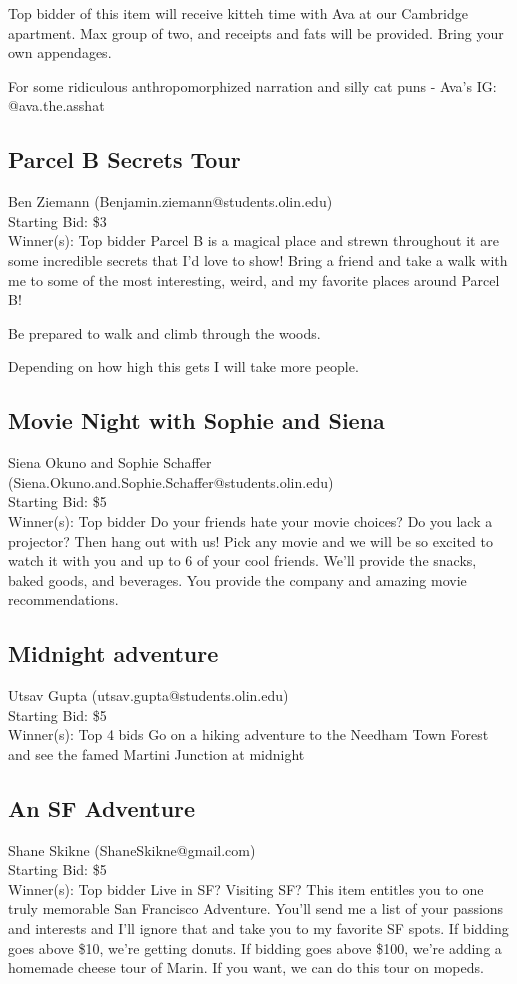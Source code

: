 \documentclass[11pt]{article}
\begin{document}
Top bidder of this item will receive kitteh time with Ava at our Cambridge apartment. Max group of two, and receipts and fats will be provided. Bring your own appendages.

For some ridiculous anthropomorphized narration and silly cat puns - Ava's IG: @ava.the.asshat
\subsection{Parcel B Secrets Tour}
Ben Ziemann (Benjamin.ziemann@students.olin.edu) \\
Starting Bid: \$3 \\
Winner(s): 
Top bidder\newline
Parcel B is a magical place and strewn throughout it are some incredible secrets that I'd love to show! Bring a friend and take a walk with me to some of the most interesting, weird, and my favorite places around Parcel B! 

Be prepared to walk and climb through the woods.

Depending on how high this gets I will take more people.
\subsection{Movie Night with Sophie and Siena}
Siena Okuno and Sophie Schaffer (Siena.Okuno.and.Sophie.Schaffer@students.olin.edu) \\
Starting Bid: \$5 \\
Winner(s): 
Top bidder\newline
Do your friends hate your movie choices? Do you lack a projector? Then hang out with us! Pick any movie and we will be so excited to watch it with you and up to 6 of your cool friends. We'll provide the snacks, baked goods, and beverages. You provide the company and amazing movie recommendations.
\subsection{Midnight adventure}
Utsav Gupta (utsav.gupta@students.olin.edu) \\
Starting Bid: \$5 \\
Winner(s): 
Top 4 bids\newline
Go on a hiking adventure to the Needham Town Forest and see the famed Martini Junction at midnight
\subsection{An SF Adventure}
Shane Skikne (ShaneSkikne@gmail.com) \\
Starting Bid: \$5 \\
Winner(s): 
Top bidder\newline
Live in SF? Visiting SF? This item entitles you to one truly memorable San Francisco Adventure. You'll send me a list of your passions and interests and I'll ignore that and take you to my favorite SF spots. 
If bidding goes above \$10, we're getting donuts.
If bidding goes above \$100, we're adding a homemade cheese tour of Marin. 
If you want, we can do this tour on mopeds.
\end{document}

